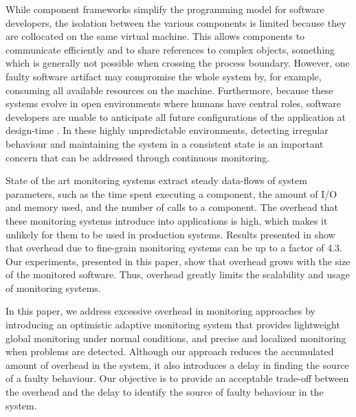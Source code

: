 While component frameworks simplify the programming model for software developers, the isolation between the various components is limited because they are collocated on the same virtual machine.
This allows components to communicate efficiently and to share references to complex objects, something which is generally not possible when crossing the process boundary.
However, one faulty software artifact may compromise the whole system by, for example, consuming all available resources on the machine.
Furthermore, because these systems evolve in open environments where humans have central roles, software developers are unable to anticipate all future configurations of the application  at design-time \cite{baresi2006toward}.
In these highly unpredictable environments, detecting irregular behaviour and maintaining the system in a consistent state is an important concern that can be addressed through continuous monitoring.

State of the art monitoring systems \cite{FrenotS04,KregerHaroldWilliamson03,Binder200645} extract steady data-flows of system parameters, such as the time spent executing a component, the amount of I/O and memory used, and the number of calls to a component.
The overhead that these monitoring systems introduce into applications is high, which makes it unlikely for them to be used in production systems.
Results presented in \cite{Binder:2009:PPV:1464245.1464249} show that overhead due to fine-grain monitoring systems can be up to a factor of 4.3.
Our experiments, presented in this paper, show that overhead grows with the size of the monitored software.
Thus, overhead greatly limits the scalability and usage of monitoring systems.

In this paper, we address excessive overhead in monitoring approaches by introducing an optimistic adaptive monitoring system that provides lightweight global monitoring under normal conditions, and precise and localized monitoring when problems are detected.
Although our approach reduces the accumulated amount of overhead in the system, it also introduces a delay in finding the source of a faulty behaviour.
Our objective is to provide an acceptable trade-off between the overhead and the delay to identify the source of faulty behaviour in the system.

